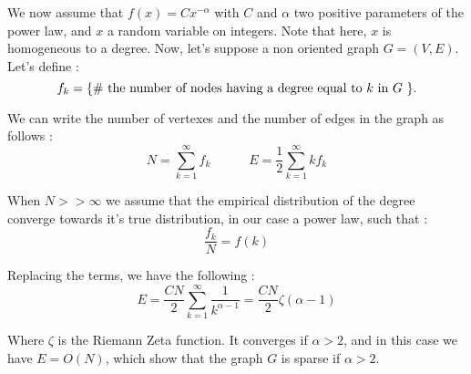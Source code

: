 \documentclass{article}
\begin{document}
We now assume that $f(x) = C x^{- \alpha}$ with $C$ and $\alpha$ two positive parameters of the power law, and $x$ a random variable on integers. Note that here,  $x$ is homogeneous to a degree. Now, let's suppose a non oriented graph $G=(V,E)$. Let's define :
\begin{equation}
    f_k =  \textnormal{\{\# the number of nodes  having a degree equal to $k$ in $G$ \}}.
\end{equation}

We can write the number of vertexes and the number of edges in the graph as follows :
\begin{equation}
    N = \sum_{k=1}^\infty f_k  \quad\qquad E = \frac{1}{2}\sum_{k=1}^\infty k f_k
\end{equation}

When $N >> \infty$ we assume that the empirical distribution of the degree converge towards it's true distribution, in our case a power law, such that :
\begin{equation}
    \frac{f_k}{N} = f(k)
\end{equation}

Replacing the terms, we have the following :
\begin{equation} \label{eq:e_zeta}
    E = \frac{CN}{2}\sum_{k=1}^\infty\frac{1}{k^{\alpha-1}} = \frac{CN}{2} \zeta(\alpha-1)
\end{equation}

Where $\zeta$ is the Riemann Zeta function. It converges if $\alpha > 2$, and in this case we have $E = O(N)$, which show that the graph $G$ is sparse if $\alpha > 2$.



\end{document}
